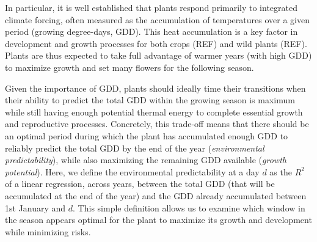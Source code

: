 \documentclass[11pt,letter]{article}
\begin{document}
In particular, it is well established that plants respond primarily to integrated climate forcing, often measured as the accumulation of temperatures over a given period (growing degree-days, GDD). This heat accumulation is a key factor in development and growth processes for both crops (REF) and wild plants (REF). Plants are thus expected to take full advantage of warmer years (with high GDD) to maximize growth and set many flowers for the following season.

Given the importance of GDD, plants should ideally time their transitions when their ability to predict the total GDD within the growing season is maximum while still having enough potential thermal energy to complete essential growth and reproductive processes. Concretely, this trade-off means that there should be an optimal period during which the plant has accumulated enough GDD to reliably predict the total GDD by the end of the year (\emph{environmental predictability}), while also maximizing the remaining GDD available (\emph{growth potential}). Here, we define the environmental predictability at a day $d$ as the $R^2$ of a linear regression, across years, between the total GDD (that will be accumulated at the end of the year) and the GDD already accumulated between 1st January and $d$. This simple definition allows us to examine which window in the season appears optimal for the plant to maximize its growth and development while minimizing risks.
\end{document}
